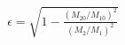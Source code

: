 


\begin{eqnarray*}
  \epsilon = \sqrt{1 - \frac{(M_{20} / M_{10})^2} {(M_2 / M_1)^2} }
\end{eqnarray*}

